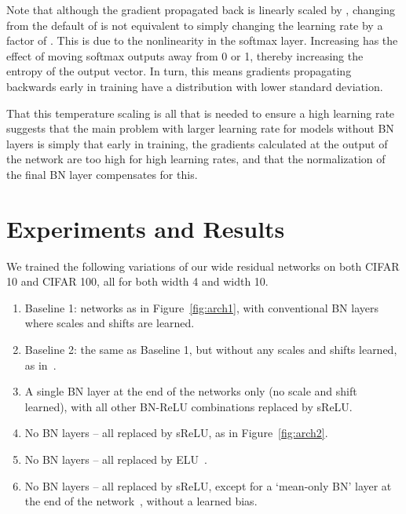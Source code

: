 \documentclass[conference]{IEEEtran}
\begin{document}
Note that although the gradient propagated back is linearly scaled by , changing from the default of  is not equivalent to simply changing the learning rate by a factor of . This is due to the nonlinearity in the softmax layer. Increasing  has the effect of moving softmax outputs away from 0 or 1, thereby increasing the entropy of the output vector. In turn, this means gradients propagating backwards early in training have a distribution with lower standard deviation.

That this temperature scaling is all that is needed to ensure a high learning rate suggests that the main problem with larger learning rate for models without BN layers is simply that early in training, the gradients calculated at the output of the network are too high for high learning rates, and that the normalization of the final BN layer compensates for this.  
















\section{Experiments and Results}\label{S4}

We trained the following variations of our wide residual networks on both CIFAR 10 and CIFAR 100, all for both width 4 and width 10. 
\begin{enumerate}
\item  Baseline 1: networks as in Figure~\ref{fig:arch1},  with conventional BN layers where scales and shifts are learned.
\item Baseline 2: the same as Baseline 1, but without any scales and shifts learned, as in~\cite{McDonnell.18}.
\item A single BN layer at the end of the networks only (no scale and shift learned), with all other BN-ReLU combinations replaced by sReLU.
\item No BN layers -- all replaced by sReLU, as in Figure~\ref{fig:arch2}.
\item No BN layers -- all replaced by ELU~\cite{Clevert.15}.
\item No BN layers -- all replaced by sReLU, except for a `mean-only BN' layer at the end of the network~\cite{Salimans_etal16a}, without a learned bias.
\end{enumerate}
\end{document}
